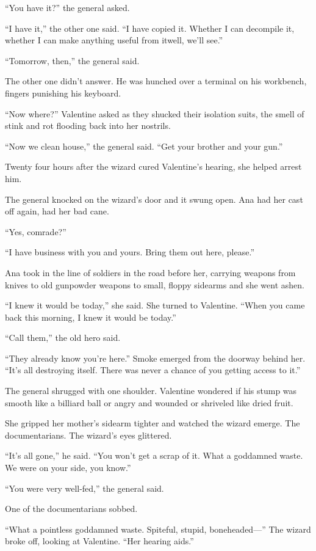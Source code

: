 “You have it?” the general asked.

“I have it,” the other one said. “I have copied it. Whether I can
decompile it, whether I can make anything useful from it\dash{}well,
we’ll see.”

“Tomorrow, then,” the general said.

The other one didn’t answer. He was hunched over a terminal on his
workbench, fingers punishing his keyboard.

“Now where?” Valentine asked as they shucked their isolation suits,
the smell of stink and rot flooding back into her nostrils.

“Now we clean house,” the general said. “Get your brother and your
gun.”

\tb

Twenty four hours after the wizard cured Va\-len\-tine’s hearing, she
helped arrest him.

The general knocked on the wizard’s door and it swung open. Ana had
her cast off again, had her bad cane.

“Yes, comrade?”

“I have business with you and yours. Bring them out here, please.”

Ana took in the line of soldiers in the road before her, carrying
weapons from knives to old gunpowder weapons to small, floppy
sidearms and she went ashen.

“I knew it would be today,” she said. She turned to Valentine.
“When you came back this morning, I knew it would be today.”

“Call them,” the old hero said.

“They already know you’re here.” Smoke emerged from the doorway
behind her. “It’s all destroying itself. There was never a chance
of you getting access to it.”

The general shrugged with one shoulder. Valentine wondered if his
stump was smooth like a billiard ball or angry and wounded or
shriveled like dried fruit.

She gripped her mother’s sidearm tighter and watched the wizard
emerge. The documentarians. The wizard’s eyes glittered.

“It’s all gone,” he said. “You won’t get a scrap of it. What a
goddamned waste. We were on your side, you know.”

“You were very well-fed,” the general said.

One of the documentarians sobbed.

“What a pointless goddamned waste. Spiteful, stupid, bone\-headed---”
The wizard broke off, looking at Valentine. “Her hearing aids.”

